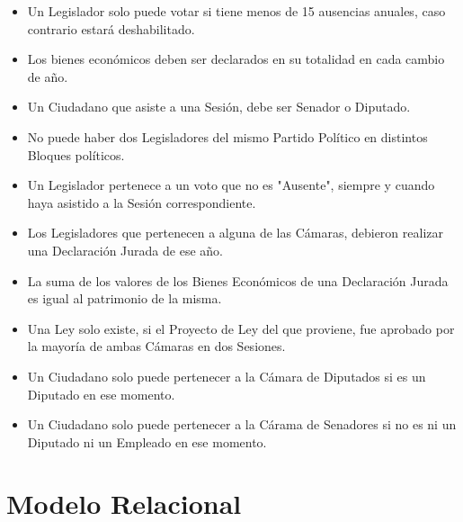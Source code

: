 \begin{itemize}
	\item Un Legislador solo puede votar si tiene menos de 15 ausencias anuales, caso contrario estará deshabilitado.
	\item Los bienes económicos deben ser declarados en su totalidad en cada cambio de año.
	\item Un Ciudadano que asiste a una Sesión, debe ser Senador o Diputado. 
	\item No puede haber dos Legisladores del mismo Partido Político en distintos Bloques políticos. 
	\item Un Legislador pertenece a un voto que no es "Ausente", siempre y cuando haya asistido a la Sesión correspondiente.
	\item Los Legisladores que pertenecen a alguna de las Cámaras, debieron realizar una Declaración Jurada de ese año.
	\item La suma de los valores de los Bienes Económicos de una Declaración Jurada es igual al patrimonio de la misma. 
	\item Una Ley solo existe, si el Proyecto de Ley del que proviene, fue aprobado por la mayoría de ambas Cámaras en dos Sesiones. 
	\item Un Ciudadano solo puede pertenecer a la Cámara de Diputados si es un Diputado en ese momento.
	\item Un Ciudadano solo puede pertenecer a la Cárama de Senadores si no es ni un Diputado ni un Empleado en ese momento. 	
	
\end{itemize}

\section{Modelo Relacional}


